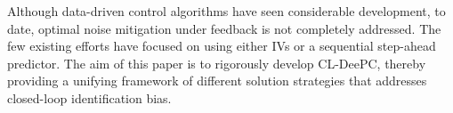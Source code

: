 Although data-driven control algorithms have seen considerable development, to date, optimal noise mitigation under feedback is not completely addressed.
The few existing efforts have focused on using either \ac{IVs} or a sequential step-ahead predictor. The aim of this paper is to rigorously develop \ac{CL-DeePC}, thereby providing a unifying framework of different solution strategies that addresses closed-loop identification bias. %
%
%

